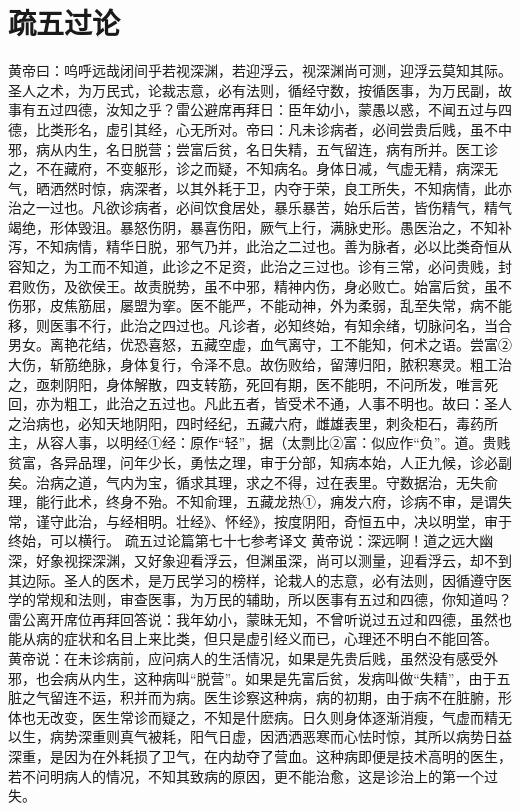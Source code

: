 \documentclass[a4paper,12pt,UTF8,twoside]{ctexbook}
\begin{document}
\chapter{疏五过论}
黄帝曰：呜呼远哉闭间乎若视深渊，若迎浮云，视深渊尚可测，迎浮云莫知其际。圣人之术，为万民式，论裁志意，必有法则，循经守数，按循医事，为万民副，故事有五过四德，汝知之乎？雷公避席再拜日：臣年幼小，蒙愚以惑，不闻五过与四德，比类形名，虚引其经，心无所对。帝曰：凡未诊病者，必间尝贵后贱，虽不中邪，病从内生，名日脱营；尝富后贫，名日失精，五气留连，病有所并。医工诊之，不在藏府，不变躯形，诊之而疑，不知病名。身体日减，气虚无精，病深无气，晒洒然时惊，病深者，以其外耗于卫，内夺于荣，良工所失，不知病情，此亦治之一过也。凡欲诊病者，必间饮食居处，暴乐暴苦，始乐后苦，皆伤精气，精气竭绝，形体毁沮。暴怒伤阴，暴喜伤阳，厥气上行，满脉史形。愚医治之，不知补泻，不知病情，精华日脱，邪气乃并，此治之二过也。善为脉者，必以比类奇恒从容知之，为工而不知道，此诊之不足资，此治之三过也。诊有三常，必问贵贱，封君败伤，及欲侯王。故责脱势，虽不中邪，精神内伤，身必败亡。始富后贫，虽不伤邪，皮焦筋屈，屡盟为挛。医不能严，不能动神，外为柔弱，乱至失常，病不能移，则医事不行，此治之四过也。凡诊者，必知终始，有知余绪，切脉问名，当合男女。离艳花结，优恐喜怒，五藏空虚，血气离守，工不能知，何术之语。尝富②大伤，斩筋绝脉，身体复行，令泽不息。故伤败给，留薄归阳，脓积寒灵。粗工治之，亟刺阴阳，身体解散，四支转筋，死回有期，医不能明，不问所发，唯言死回，亦为粗工，此治之五过也。凡此五者，皆受术不通，人事不明也。故曰：圣人之治病也，必知天地阴阳，四时经纪，五藏六府，雌雄表里，刺灸柜石，毒药所主，从容人事，以明经①经：原作“轻”，据（太剽比②富：似应作“负”。道。贵贱贫富，各异品理，问年少长，勇怯之理，审于分部，知病本始，人正九候，诊必副矣。治病之道，气内为宝，循求其理，求之不得，过在表里。守数据治，无失俞理，能行此术，终身不殆。不知俞理，五藏龙热①，痈发六府，诊病不审，是谓失常，谨守此治，与经相明。壮经》、怀经》，按度阴阳，奇恒五中，决以明堂，审于终始，可以横行。
疏五过论篇第七十七参考译文
黄帝说：深远啊！道之远大幽深，好象视探深渊，又好象迎看浮云，但渊虽深，尚可以测量，迎看浮云，却不到其边际。圣人的医术，是万民学习的榜样，论栽人的志意，必有法则，因循遵守医学的常规和法则，审查医事，为万民的辅助，所以医事有五过和四德，你知道吗？雷公离开席位再拜回答说：我年幼小，蒙昧无知，不曾听说过五过和四德，虽然也能从病的症状和名目上来比类，但只是虚引经义而已，心理还不明白不能回答。
黄帝说：在未诊病前，应问病人的生活情况，如果是先贵后贱，虽然没有感受外邪，也会病从内生，这种病叫“脱营”。如果是先富后贫，发病叫做“失精”，由于五脏之气留连不运，积并而为病。医生诊察这种病，病的初期，由于病不在脏腑，形体也无改变，医生常诊而疑之，不知是什麽病。日久则身体逐渐消瘦，气虚而精无以生，病势深重则真气被耗，阳气日虚，因洒洒恶寒而心怯时惊，其所以病势日益深重，是因为在外耗损了卫气，在内劫夺了营血。这种病即便是技术高明的医生，若不问明病人的情况，不知其致病的原因，更不能治愈，这是诊治上的第一个过失。
\end{document}
